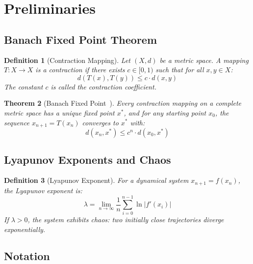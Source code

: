 \documentclass[11pt,a4paper]{article}
\newtheorem{theorem}{Theorem}[section]
\newtheorem{definition}[theorem]{Definition}
\begin{document}
\section{Preliminaries}
\label{sec:prelim}

\subsection{Banach Fixed Point Theorem}

\begin{definition}[Contraction Mapping]
Let $(X,d)$ be a metric space. A mapping $T: X \to X$ is a \textit{contraction} if there exists $c \in [0,1)$ such that for all $x,y \in X$:
\begin{equation}
    d(T(x), T(y)) \leq c \cdot d(x,y)
\end{equation}
The constant $c$ is called the \textit{contraction coefficient}.
\end{definition}

\begin{theorem}[Banach Fixed Point~\cite{banach1922}]
Every contraction mapping on a complete metric space has a unique fixed point $x^*$, and for any starting point $x_0$, the sequence $x_{n+1} = T(x_n)$ converges to $x^*$ with:
\begin{equation}
    d(x_n, x^*) \leq c^n \cdot d(x_0, x^*)
\end{equation}
\end{theorem}

\subsection{Lyapunov Exponents and Chaos}

\begin{definition}[Lyapunov Exponent]
For a dynamical system $x_{n+1} = f(x_n)$, the Lyapunov exponent is:
\begin{equation}
    \lambda = \lim_{n \to \infty} \frac{1}{n} \sum_{i=0}^{n-1} \ln|f'(x_i)|
\end{equation}
If $\lambda > 0$, the system exhibits \textit{chaos}: two initially close trajectories diverge exponentially.
\end{definition}

\subsection{Notation}
\end{document}
